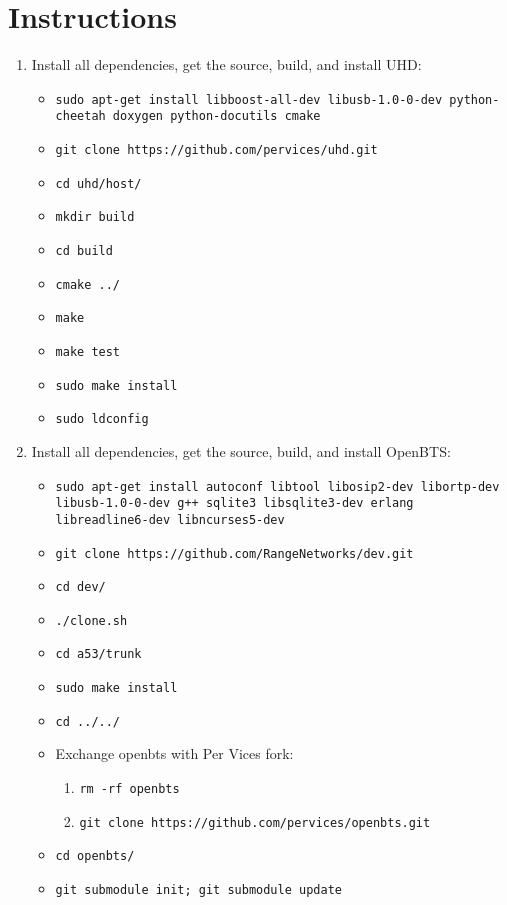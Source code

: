 \documentclass[11pt]{article}
\begin{document}
\section{Instructions}
	\begin{enumerate}
	\item Install all dependencies, get the source, build, and install UHD:
	\begin{itemize}
		\item \texttt{sudo apt-get install libboost-all-dev libusb-1.0-0-dev python-cheetah doxygen python-docutils cmake}
		\item \texttt{git clone https://github.com/pervices/uhd.git}
		\item \texttt{cd uhd/host/}
		\item \texttt{mkdir build}
		\item \texttt{cd build}
		\item \texttt{cmake ../}
		\item \texttt{make}
		\item \texttt{make test}
		\item \texttt{sudo make install}
		\item \texttt{sudo ldconfig}
	\end{itemize}		
	\item Install all dependencies, get the source, build, and install OpenBTS:
	\begin{itemize}
		\item \texttt{sudo apt-get install autoconf libtool libosip2-dev libortp-dev libusb-1.0-0-dev g++ sqlite3 libsqlite3-dev erlang libreadline6-dev libncurses5-dev}
		\item \texttt{git clone https://github.com/RangeNetworks/dev.git}
		\item \texttt{cd dev/}
		\item \texttt{./clone.sh}
		\item \texttt{cd a53/trunk}
		\item \texttt{sudo make install}
		\item \texttt{cd ../../}
		\item Exchange openbts with Per Vices fork:
		\begin{enumerate}
			\item \texttt{rm -rf openbts}
			\item \texttt{git clone https://github.com/pervices/openbts.git}
		\end{enumerate}
		\item \texttt{cd openbts/}
		\item \texttt{git submodule init; git submodule update}

\end{itemize}
\end{enumerate}
\end{document}
